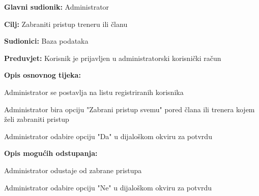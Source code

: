 		\noindent {}
		\begin{packed_item}
		
			\item \textbf{Glavni sudionik: } Administrator
			\item  \textbf{Cilj: } Zabraniti pristup treneru ili članu
			\item  \textbf{Sudionici: } Baza podataka
			\item  \textbf{Preduvjet: } Korisnik je prijavljen u administratorski korisnički račun
			\item  \textbf{Opis osnovnog tijeka:}
		
			\item[] \begin{packed_enum}
			
				\item Administrator se postavlja na listu registriranih korisnika
				\item Administrator bira opciju "Zabrani pristup svemu" pored člana ili trenera kojem želi zabraniti pristup
				\item Administrator odabire opciju "Da" u dijaloškom okviru za potvrdu
			\end{packed_enum}
		
			\item  \textbf{Opis mogućih odstupanja:}
		
			\item[] \begin{packed_item}
			
				\item[3.a] Administrator odustaje od zabrane pristupa
				\item[] \begin{packed_enum}
				
					\item Administrator odabire opciju "Ne" u dijaloškom okviru za potvrdu
				
				\end{packed_enum}
			\end{packed_item}
		
		\end{packed_item}
	
		\eject

